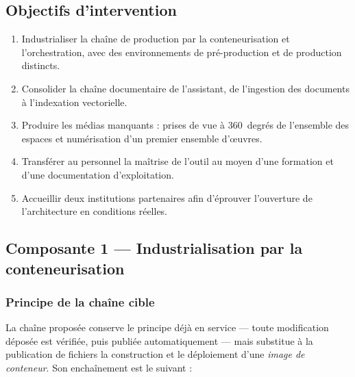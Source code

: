 \subsection{Objectifs d'intervention}


\begin{enumerate}
  \item[\textbf{OI1.}] Industrialiser la chaîne de production par la
        conteneurisation et l'orchestration, avec des environnements de
        pré-production et de production distincts.
  \item[\textbf{OI2.}] Consolider la chaîne documentaire de l'assistant, de
        l'ingestion des documents à l'indexation vectorielle.
  \item[\textbf{OI3.}] Produire les médias manquants : prises de vue à
        360~degrés de l'ensemble des espaces et numérisation d'un premier
        ensemble d'œuvres.
  \item[\textbf{OI4.}] Transférer au personnel la maîtrise de l'outil au moyen
        d'une formation et d'une documentation d'exploitation.
  \item[\textbf{OI5.}] Accueillir deux institutions partenaires afin d'éprouver
        l'ouverture de l'architecture en conditions réelles.
\end{enumerate}

\subsection{Composante 1 — Industrialisation par la conteneurisation}

\subsubsection{Principe de la chaîne cible}

La chaîne proposée conserve le principe déjà en service — toute modification
déposée est vérifiée, puis publiée automatiquement — mais substitue à la
publication de fichiers la construction et le déploiement d'une \emph{image de
conteneur}. Son enchaînement est le suivant :


